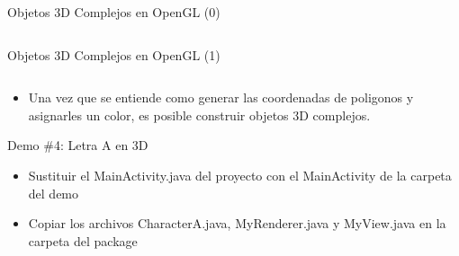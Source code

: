 \documentclass[aspectratio=169,compress]{beamer}
\begin{document}
\begin{frame}{Objetos 3D Complejos en OpenGL (0)}
\begin{columns}
\begin{column}{0.3\textwidth}
\begin{center}
\end{center}
\end{column}
\end{columns}



\end{frame}







\begin{frame}{Objetos 3D Complejos en OpenGL (1)}

\begin{columns}
\begin{column}{0.8\textwidth}
\begin{itemize}
\item Una vez que se entiende como generar las coordenadas de poligonos y asignarles un color, es posible construir objetos 3D complejos.
\end{itemize}
\begin{block}{Demo \#4: Letra A en 3D}
\begin{itemize}
\item Sustituir el MainActivity.java del proyecto con el MainActivity de la carpeta del demo
\item Copiar los archivos CharacterA.java, MyRenderer.java y MyView.java en la carpeta del package
\end{itemize}

\end{block}


\end{column}
\end{columns}
\end{frame}
\end{document}
